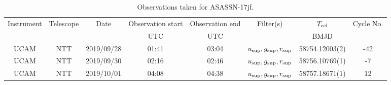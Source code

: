 \begin{table}
	\begin{center}
		\begin{tabular}{cccccccc}
			\hline
			Instrument & Telescope & Date & Observation start & Observation end & Filter(s) & $T_{\rm ecl}$ & Cycle No. \\
			 &  &  & UTC & UTC &  & BMJD &  \\
			\hline
			\hline
			UCAM & NTT & 2019/09/28 & 01:41 & 03:04 & $u_{\rm sup},g_{\rm sup},r_{\rm sup}$ & 58754.12003(2)                                                                                                            &                                         -42 \\
			UCAM & NTT & 2019/09/30 & 02:16 & 02:46 & $u_{\rm sup},g_{\rm sup},r_{\rm sup}$ & 58756.10769(1)                                                                                                            &                                          -7 \\
			UCAM & NTT & 2019/10/01 & 04:08 & 04:38 & $u_{\rm sup},g_{\rm sup},r_{\rm sup}$ & 58757.18671(1)                                                                                                            &                                          12 \\
		   \hline
		\end{tabular}
	\end{center}
	\caption{Observations taken for ASASSN-17jf.}
	\label{table:observing:observation logs ASASSN-17jf}
\end{table}